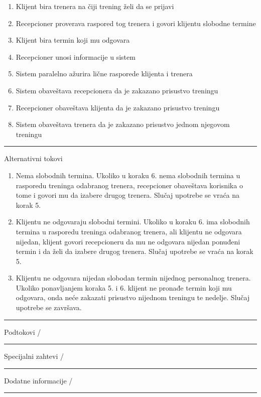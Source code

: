 \begin{center}
\begin{enumerate}
    \item Klijent bira trenera na čiji trening želi da se prijavi
    \item Recepcioner proverava raspored tog trenera i govori klijentu slobodne termine
    \item Klijent bira termin koji mu odgovara
    \item Recepcioner unosi informacije u sistem
    \item Sistem paralelno ažurira lične rasporede klijenta i trenera
    \item Sistem obaveštava recepcionera da je zakazano prisustvo treningu
    \item Recepcioner obaveštava klijenta da je zakazano prisustvo treningu
    \item Sistem obaveštava trenera da je zakazano prisustvo jednom njegovom treningu
   \end{enumerate}
\hrule
\vspace{0.2cm}
    Alternativni tokovi 
    \begin{enumerate}
    \item Nema slobodnih termina. Ukoliko u koraku 6. nema slobodnih termina u rasporedu treninga odabranog trenera, recepcioner obaveštava korisnika o tome i govori mu da izabere drugog trenera. Slučaj upotrebe se vraća na korak 5.
    \item Klijentu ne odgovaraju slobodni termini. Ukoliko u koraku 6. ima slobodnih termina u rasporedu treninga odabranog trenera, ali klijentu ne odgovara nijedan, klijent govori recepcioneru da mu ne odgovara nijedan ponuđeni termin i da želi da izabere drugog trenera. Slučaj upotrebe se vraća na korak 5.
    \item Klijentu ne odgovara nijedan slobodan termin nijednog personalnog trenera. Ukoliko ponavljanjem koraka 5. i 6. klijent ne pronađe termin koji mu odgovara, onda neće zakazati prisustvo nijednom treningu te nedelje. Slučaj upotrebe se završava.
   \end{enumerate}
\hrule
\vspace{0.2cm}
    Podtokovi /\\
\hrule
\vspace{0.2cm}
    Specijalni zahtevi /\\
\hrule
\vspace{0.2cm}
    Dodatne informacije /\\
\hrule
\vspace{0.5cm}
\end{center}




